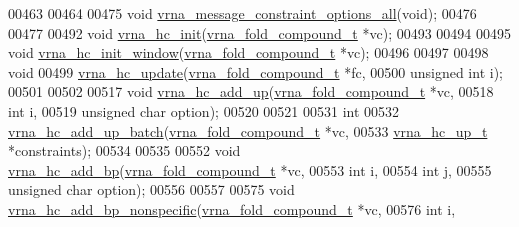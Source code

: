 \begin{DoxyCode}
00463 
00464 
00475 \textcolor{keywordtype}{void} \mbox{\hyperlink{group__constraints_gaec7e13fa0465c2acc7a621d1aecb709f}{vrna\_message\_constraint\_options\_all}}(\textcolor{keywordtype}{void});
00476 
00477 
00492 \textcolor{keywordtype}{void} \mbox{\hyperlink{group__hard__constraints_ga36ff456c43bf920629cee5a236e4f0ff}{vrna\_hc\_init}}(\mbox{\hyperlink{group__fold__compound_structvrna__fc__s}{vrna\_fold\_compound\_t}} *vc);
00493 
00494 
00495 \textcolor{keywordtype}{void} \mbox{\hyperlink{constraints__hard_8h_a008eccd46195a91d23c9ca8c935552ee}{vrna\_hc\_init\_window}}(\mbox{\hyperlink{group__fold__compound_structvrna__fc__s}{vrna\_fold\_compound\_t}} *vc);
00496 
00497 
00498 \textcolor{keywordtype}{void}
00499 \mbox{\hyperlink{constraints__hard_8h_aa3e18ff4fd14a9e75210204104c7a606}{vrna\_hc\_update}}(\mbox{\hyperlink{group__fold__compound_structvrna__fc__s}{vrna\_fold\_compound\_t}} *fc,
00500                \textcolor{keywordtype}{unsigned} \textcolor{keywordtype}{int}         i);
00501 
00502 
00517 \textcolor{keywordtype}{void} \mbox{\hyperlink{group__hard__constraints_ga447d88e06ad97bb225cd83310ace8345}{vrna\_hc\_add\_up}}(\mbox{\hyperlink{group__fold__compound_structvrna__fc__s}{vrna\_fold\_compound\_t}}  *vc,
00518                     \textcolor{keywordtype}{int}                   i,
00519                     \textcolor{keywordtype}{unsigned} \textcolor{keywordtype}{char}         option);
00520 
00521 
00531 \textcolor{keywordtype}{int}
00532 \mbox{\hyperlink{group__hard__constraints_ga5070f296c8af2baea10951525519464f}{vrna\_hc\_add\_up\_batch}}(\mbox{\hyperlink{group__fold__compound_structvrna__fc__s}{vrna\_fold\_compound\_t}} *vc,
00533                      \mbox{\hyperlink{group__hard__constraints_structvrna__hc__up__s}{vrna\_hc\_up\_t}}         *constraints);
00534 
00535 
00552 \textcolor{keywordtype}{void} \mbox{\hyperlink{group__hard__constraints_ga7cba95ebe2ceb5ec9a5768f2232854fd}{vrna\_hc\_add\_bp}}(\mbox{\hyperlink{group__fold__compound_structvrna__fc__s}{vrna\_fold\_compound\_t}}  *vc,
00553                     \textcolor{keywordtype}{int}                   i,
00554                     \textcolor{keywordtype}{int}                   j,
00555                     \textcolor{keywordtype}{unsigned} \textcolor{keywordtype}{char}         option);
00556 
00557 
00575 \textcolor{keywordtype}{void} \mbox{\hyperlink{group__hard__constraints_gaed50398ade2d4852c9e82592fe76046c}{vrna\_hc\_add\_bp\_nonspecific}}(\mbox{\hyperlink{group__fold__compound_structvrna__fc__s}{vrna\_fold\_compound\_t}}  *vc,
00576                                 \textcolor{keywordtype}{int}                   i,

\end{DoxyCode}

